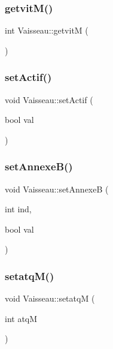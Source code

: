 \mbox{\label{class_vaisseau_a78f7e268cdb61a39e3292e80309a4ca8}} 
\subsubsection{\texorpdfstring{getvit\+M()}{getvitM()}}
{\footnotesize\ttfamily int Vaisseau\+::getvitM (\begin{DoxyParamCaption}{ }\end{DoxyParamCaption})}

\mbox{\label{class_vaisseau_a90ac143853468f0aa9f4e83b74882a04}} 
\subsubsection{\texorpdfstring{set\+Actif()}{setActif()}}
{\footnotesize\ttfamily void Vaisseau\+::set\+Actif (\begin{DoxyParamCaption}\item[{bool}]{val }\end{DoxyParamCaption})}

\mbox{\label{class_vaisseau_adb209377f322d5dac4ec0f5de330b0fc}} 
\subsubsection{\texorpdfstring{set\+Annexe\+B()}{setAnnexeB()}}
{\footnotesize\ttfamily void Vaisseau\+::set\+AnnexeB (\begin{DoxyParamCaption}\item[{int}]{ind,  }\item[{bool}]{val }\end{DoxyParamCaption})}

\mbox{\label{class_vaisseau_ac1eaf0b717e81471f259ce94ad0afb20}} 
\subsubsection{\texorpdfstring{setatq\+M()}{setatqM()}}
{\footnotesize\ttfamily void Vaisseau\+::setatqM (\begin{DoxyParamCaption}\item[{int}]{atqM }\end{DoxyParamCaption})}


